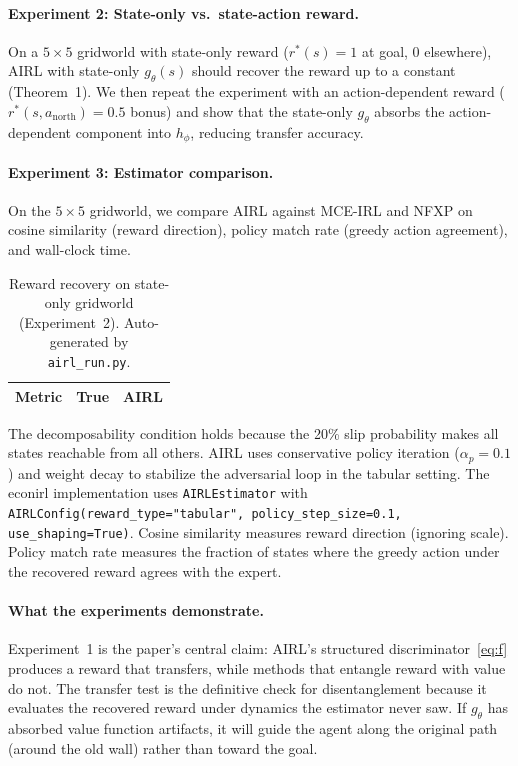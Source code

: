 \documentclass[11pt]{article}
\begin{document}
\paragraph{Experiment 2: State-only vs.\ state-action reward.}
On a $5 \times 5$ gridworld with state-only reward ($r^*(s) = 1$ at goal, $0$ elsewhere), AIRL with state-only $g_\theta(s)$ should recover the reward up to a constant (Theorem~1).
We then repeat the experiment with an action-dependent reward ($r^*(s, a_{\text{north}}) = 0.5$ bonus) and show that the state-only $g_\theta$ absorbs the action-dependent component into $h_\phi$, reducing transfer accuracy.

\paragraph{Experiment 3: Estimator comparison.}
On the $5 \times 5$ gridworld, we compare AIRL against MCE-IRL and NFXP on cosine similarity (reward direction), policy match rate (greedy action agreement), and wall-clock time.

\begin{table}[h!]
\centering\small
\begin{tabular}{lrr}
\toprule
Metric & True & AIRL \\
\midrule

\bottomrule
\end{tabular}
\caption{Reward recovery on state-only gridworld (Experiment~2). Auto-generated by \texttt{airl\_run.py}.}
\label{tab:results}
\end{table}
\FloatBarrier

The decomposability condition holds because the 20\% slip probability makes all states reachable from all others.
AIRL uses conservative policy iteration ($\alpha_p = 0.1$) and weight decay to stabilize the adversarial loop in the tabular setting.
The econirl implementation uses \texttt{AIRLEstimator} with \texttt{AIRLConfig(reward\_type="tabular", policy\_step\_size=0.1, use\_shaping=True)}.
Cosine similarity measures reward direction (ignoring scale).
Policy match rate measures the fraction of states where the greedy action under the recovered reward agrees with the expert.

\paragraph{What the experiments demonstrate.}
Experiment~1 is the paper's central claim: AIRL's structured discriminator~\eqref{eq:f} produces a reward that transfers, while methods that entangle reward with value do not.
The transfer test is the definitive check for disentanglement because it evaluates the recovered reward under dynamics the estimator never saw.
If $g_\theta$ has absorbed value function artifacts, it will guide the agent along the original path (around the old wall) rather than toward the goal.
\end{document}
